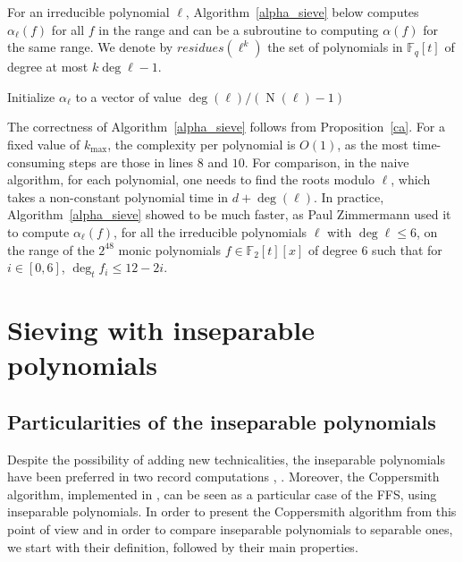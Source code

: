 \documentclass[a4wide]{article}
\newcommand{\F}{{\mathbb F}}
\DeclareMathOperator{\Norm}{N}
\theoremstyle{plain}
\theoremstyle{definition}
\theoremstyle{remark}
\begin{document}
For an irreducible polynomial $\ell$, Algorithm~\ref{alpha_sieve} below
computes $\alpha_\ell(f)$ for all $f$ in the range
and can be a subroutine to computing $\alpha(f)$ for the same range. We
denote by $residues(\ell^k)$ the set of polynomials in $\F_q[t]$ of degree
at most $k\deg\ell -1$.
\begin{algorithm}
\caption{The alpha sieve}
\begin{algorithmic}[1]
\State Initialize $\alpha_\ell$ to a vector of value $\deg(
\ell)/(\Norm(\ell)-1)$
\State{ $\alpha_\ell(f)$ $\gets$
$\alpha_\ell(f)$ $-$ $\deg(\ell)\Norm(\ell)^{1-k}/(\Norm(\ell)+1)$ }
\Else
\State{ $\alpha_\ell(f)$ $\gets$
$\alpha_\ell(f)$ $-$ $\deg(\ell)\Norm(\ell)^{2-k}/(\Norm(\ell)^2-1)$ }
\EndIf
\EndFor
\EndFor
\EndFor
\end{algorithmic}
\label{alpha_sieve}
\end{algorithm}

The correctness of Algorithm~\ref{alpha_sieve} follows from
Proposition~\ref{ca}. For a fixed value of $k_\mathrm{max}$,
the complexity per polynomial is
$O(1)$, as the most time-consuming steps are those in
lines $8$ and $10$. For comparison, in the naive algorithm, for each
polynomial, one needs to find the roots modulo $\ell$, which takes a
non-constant polynomial time in $d+\deg(\ell)$. In practice,
Algorithm~\ref{alpha_sieve} showed to be much faster, as Paul Zimmermann
used it to compute $\alpha_\ell(f)$, for all the irreducible polynomials
$\ell$ with $\deg\ell\leq 6$, on the range of the $2^{48}$ monic polynomials $f\in\F_2[t][x]$ of degree $6$ such that for
$i\in[0,6]$, $\deg_t f_i\leq 12-2i$.

\section{Sieving with inseparable polynomials}\label{insep}
\subsection{Particularities of the inseparable polynomials}
Despite the possibility of adding new technicalities, the inseparable
polynomials have been preferred in two record computations
\cite{Japanese2010}, \cite{Japanese2012}. Moreover, the Coppersmith
algorithm, implemented in \cite{Tho03}, can be seen as a
particular case of the FFS, using inseparable polynomials. In order to
present the Coppersmith algorithm from this point of view and in order to compare inseparable polynomials to separable ones, we start
with their definition, followed by their main properties.  
\end{document}
